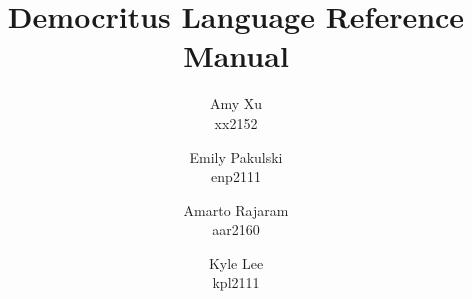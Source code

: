 \documentclass{report}
\author{Amy Xu \\ \small{xx2152} \and Emily Pakulski \\ \small{enp2111} \and Amarto Rajaram \\ \small{aar2160} \and Kyle Lee\\ \small{kpl2111}}
\title{Democritus Language Reference Manual}
\begin{document}
	\maketitle
	\tableofcontents
	\pagebreak
	
	
    
    
    
    
    
    
\end{document}
